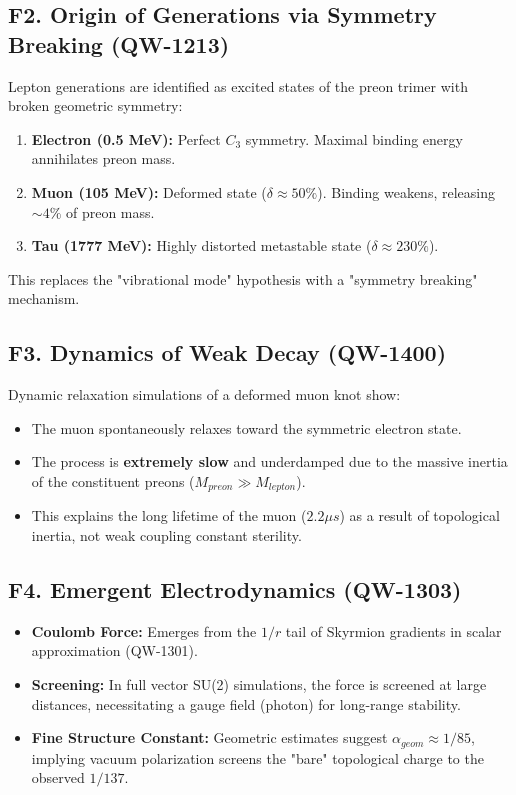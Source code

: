 \documentclass[11pt, a4paper]{article}
\theoremstyle{remark}
\begin{document}
\subsection{F2. Origin of Generations via Symmetry Breaking (QW-1213)}
Lepton generations are identified as excited states of the preon trimer with broken geometric symmetry:
\begin{enumerate}
    \item \textbf{Electron (0.5 MeV):} Perfect $C_3$ symmetry. Maximal binding energy annihilates preon mass.
    \item \textbf{Muon (105 MeV):} Deformed state ($\delta \approx 50\%$). Binding weakens, releasing $\sim 4\%$ of preon mass.
    \item \textbf{Tau (1777 MeV):} Highly distorted metastable state ($\delta \approx 230\%$).
\end{enumerate}
This replaces the "vibrational mode" hypothesis with a "symmetry breaking" mechanism.

\subsection{F3. Dynamics of Weak Decay (QW-1400)}
Dynamic relaxation simulations of a deformed muon knot show:
\begin{itemize}
    \item The muon spontaneously relaxes toward the symmetric electron state.
    \item The process is \textbf{extremely slow} and underdamped due to the massive inertia of the constituent preons ($M_{preon} \gg M_{lepton}$).
    \item This explains the long lifetime of the muon ($2.2 \mu s$) as a result of topological inertia, not weak coupling constant sterility.
\end{itemize}

\subsection{F4. Emergent Electrodynamics (QW-1303)}
\begin{itemize}
    \item \textbf{Coulomb Force:} Emerges from the $1/r$ tail of Skyrmion gradients in scalar approximation (QW-1301).
    \item \textbf{Screening:} In full vector SU(2) simulations, the force is screened at large distances, necessitating a gauge field (photon) for long-range stability.
    \item \textbf{Fine Structure Constant:} Geometric estimates suggest $\alpha_{geom} \approx 1/85$, implying vacuum polarization screens the "bare" topological charge to the observed $1/137$.
\end{itemize}
\end{document}
